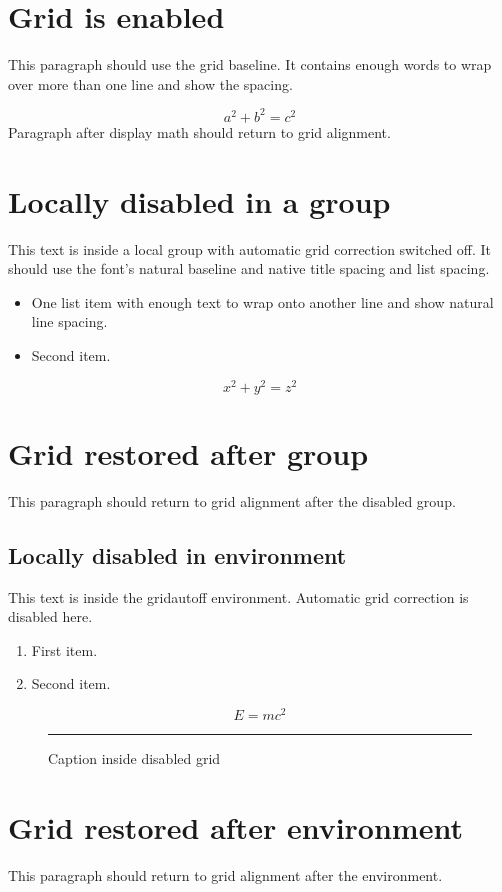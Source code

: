 \documentclass{article}
\begin{document}
\section{Grid is enabled}
This paragraph should use the grid baseline. It contains enough words to wrap over more than one line and show the spacing.

\begin{equation}
 a^2+b^2=c^2
\end{equation}
Paragraph after display math should return to grid alignment.

{\GridAutoOff
\section{Locally disabled in a group}
This text is inside a local group with automatic grid correction switched off. It should use the font's natural baseline and native title spacing and list spacing.

\begin{itemize}
\item One list item with enough text to wrap onto another line and show natural line spacing.
\item Second item.
\end{itemize}
\begin{equation}
 x^2+y^2=z^2
\end{equation}
}

\section{Grid restored after group}
This paragraph should return to grid alignment after the disabled group.

\begin{gridautoff}
\section{Locally disabled in environment}
This text is inside the gridautoff environment. Automatic grid correction is disabled here.
\begin{enumerate}
\item First item.
\item Second item.
\end{enumerate}
\begin{equation}
 E=mc^2
\end{equation}
\begin{figure}[tb]
  \centering\rule{2cm}{1cm}
  \caption{Caption inside disabled grid}
\end{figure}
\end{gridautoff}

\section{Grid restored after environment}
This paragraph should return to grid alignment after the environment.
\end{document}
